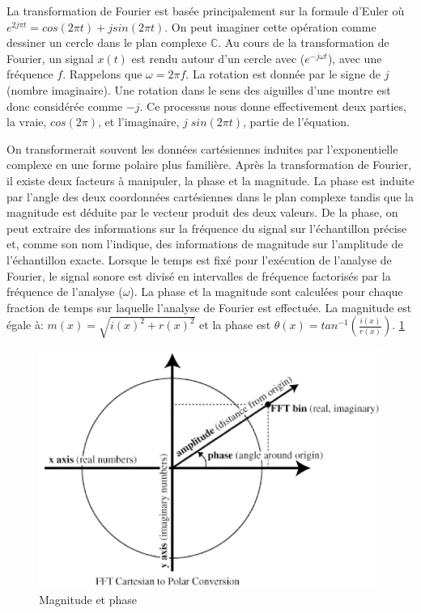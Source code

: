 La transformation de Fourier est basée principalement sur la formule d'Euler où $ e ^ {2 j \pi t} = cos (2 \pi t) + j sin (2 \pi t) $. On peut imaginer cette opération comme dessiner un cercle dans le plan complexe $ \mathbb{C} $. Au cours de la transformation de Fourier, un signal $ x(t) $ est rendu autour d'un cercle avec ($ e ^ {- j \omega t} $), avec une fréquence $ f $. Rappelons que $ \omega = 2 \pi f $. La rotation est donnée par le signe de $ j $ (nombre imaginaire). Une rotation dans le sens des aiguilles d'une montre est donc considérée comme $ -j $. Ce processus nous donne effectivement deux parties, la vraie, $ cos (2 \pi) $, et l’imaginaire, $ j \; sin (2 \pi t) $,  partie de l'équation.

On transformerait souvent les données cartésiennes induites par l'exponentielle complexe en une forme polaire plus familière. Après la transformation de Fourier, il existe deux facteurs à manipuler, la phase et la magnitude. La phase est induite par l'angle des deux coordonnées cartésiennes dans le plan complexe tandis que la magnitude est déduite par le vecteur produit des deux valeurs. De la phase, on peut extraire des informations sur la fréquence du signal sur l'échantillon précise et, comme son nom l’indique, des informations de magnitude sur l’amplitude de l’échantillon exacte. Lorsque le temps est fixé pour l'exécution de l'analyse de Fourier, le signal sonore est divisé en intervalles de fréquence factorisés par la fréquence de l'analyse ($ \omega $). La phase et la magnitude sont calculées pour chaque fraction de temps sur laquelle l'analyse de Fourier est effectuée. La magnitude est égale à: $ m (x) = \sqrt{i (x) ^ 2 + r (x) ^ 2} $ et la phase est $ \theta (x) = tan ^ {- 1} (\frac{i (x)}{r (x)}) $. \ref{MagnitudePhase}

         \begin{figure}
            \centering
            \includegraphics[width = 0.5 \textwidth ]{Graphs/Fourier_Circle_2.jpg}
            \caption{Magnitude et phase}
            \label{MagnitudePhase}
        \end{figure}

